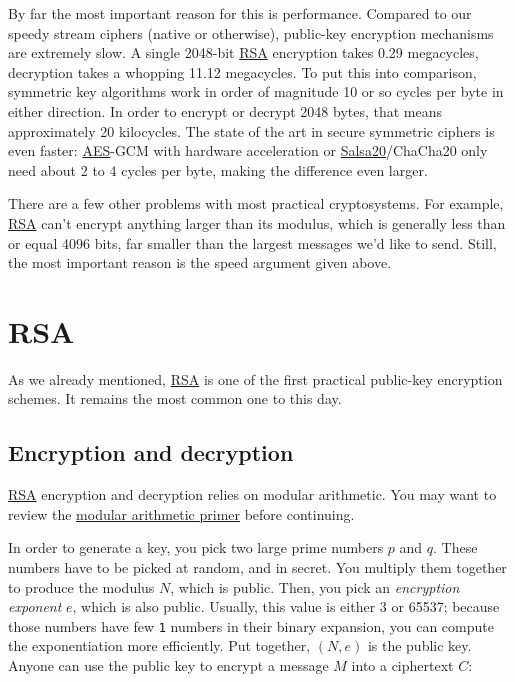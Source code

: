 \documentclass[11pt,ebook,table,dvipsnames]{memoir}
\begin{document}
By far the most important reason for this is performance. Compared to
our speedy stream ciphers (native or otherwise), public-key encryption
mechanisms are extremely slow. A single 2048-bit \hyperref[RSA]{RSA} encryption takes
0.29 megacycles, decryption takes a whopping 11.12 megacycles.
\cite{cryptopp:bench} To put this into comparison, symmetric key
algorithms work in order of magnitude 10 or so cycles per byte in
either direction. In order to encrypt or decrypt 2048 bytes, that
means approximately 20 kilocycles. The state of the art in secure
symmetric ciphers is even faster: \hyperref[AES]{AES}-GCM with hardware acceleration
or \hyperref[Salsa20]{Salsa20}/ChaCha20 only need about 2 to 4 cycles per byte, making the
difference even larger.

There are a few other problems with most practical cryptosystems. For
example, \hyperref[RSA]{RSA} can't encrypt anything larger than its modulus, which is
generally less than or equal 4096 bits, far smaller than the largest
messages we'd like to send. Still, the most important reason is the
speed argument given above.
\section{\label{RSA}RSA}
\label{sec-2-5-3}

As we already mentioned, \hyperref[RSA]{RSA} is one of the first practical
\gls{public-key encryption} schemes. It remains the most common one
to this day.

\subsection{Encryption and decryption}
\label{sec-2-5-3-1}

\hyperref[RSA]{RSA} encryption and decryption relies on modular arithmetic. You may
want to review the \hyperref[Modular-arithmetic]{modular arithmetic primer} before continuing.

In order to generate a key, you pick two large prime numbers $p$ and
$q$. These numbers have to be picked at random, and in secret. You
multiply them together to produce the modulus $N$, which is public.
Then, you pick an \emph{encryption exponent} $e$, which is also public.
Usually, this value is either 3 or 65537; because those numbers have
few \verb~1~ numbers in their binary expansion, you can compute the
exponentiation more efficiently. Put together, $(N, e)$ is the public
key. Anyone can use the public key to encrypt a message $M$ into a
ciphertext $C$:
\end{document}
